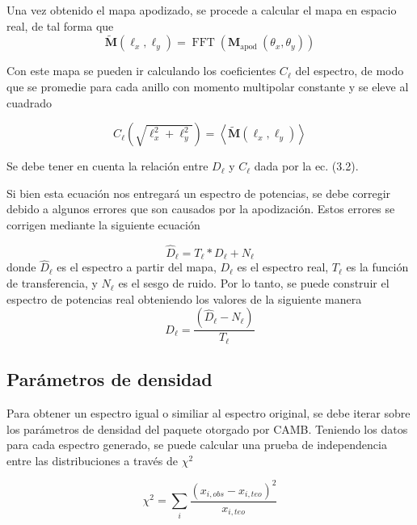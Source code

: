 \documentclass[twocolumn,letterpaper,spanish]{revtex4}
\numberwithin{equation}{section}
\begin{document}
Una vez obtenido el mapa apodizado, se procede a calcular el mapa en espacio real, de tal forma que
\begin{equation}
\tilde{\mathbf{M}}\left(\ell_{x}, \ell_{y}\right)=\operatorname{FFT}\left(\mathbf{M}_{\text {apod }}\left(\theta_{x}, \theta_{y}\right)\right)
\end{equation}

Con este mapa se pueden ir calculando los coeficientes $C_\ell$ del espectro, de modo que se promedie para cada anillo con momento multipolar constante y se eleve al cuadrado 

\begin{equation}
C_{\ell}\left(\sqrt{\ell_{x}^{2}+\ell_{y}^{2}}\right)=\left\langle\tilde{\mathbf{M}}\left(\ell_{x}, \ell_{y}\right)\right\rangle
\end{equation}

Se debe tener en cuenta la relaci\'on entre $D_{\ell}$ y $C_{\ell}$ dada por la ec. (3.2).

Si bien esta ecuaci\'on nos entregar\'a un espectro de potencias, se debe corregir debido a algunos errores que son causados por la apodizaci\'on. Estos errores se corrigen mediante la siguiente ecuaci\'on

\begin{equation}
\hat{D}_{\ell}=T_{\ell} * D_{\ell}+N_{\ell}
\end{equation}
donde $\hat{D}_{\ell}$ es el espectro a partir del mapa, $D_{\ell}$ es el espectro real, $T_{\ell}$ es la funci\'on de transferencia, y $N_{\ell}$ es el sesgo de ruido.
Por lo tanto, se puede construir el espectro de potencias real obteniendo los valores de la siguiente manera
\begin{equation}
D_{\ell}=\frac{\left(\hat{D}_{\ell}-N_{\ell}\right)}{T_{\ell}}
\end{equation}


\subsection{Par\'ametros de densidad}\label{parametros}

Para obtener un espectro igual o similiar al espectro original, se debe iterar sobre los par\'ametros de densidad del paquete otorgado por CAMB. Teniendo los datos para cada espectro generado, se puede calcular una prueba de independencia entre las distribuciones a trav\'es de $\chi^2$

\begin{equation}
\chi^2 = \displaystyle\sum_{i} \frac{(x_{i,obs} - x_{i,teo})^2}{x_{i,teo}}
\end{equation}
\end{document}
